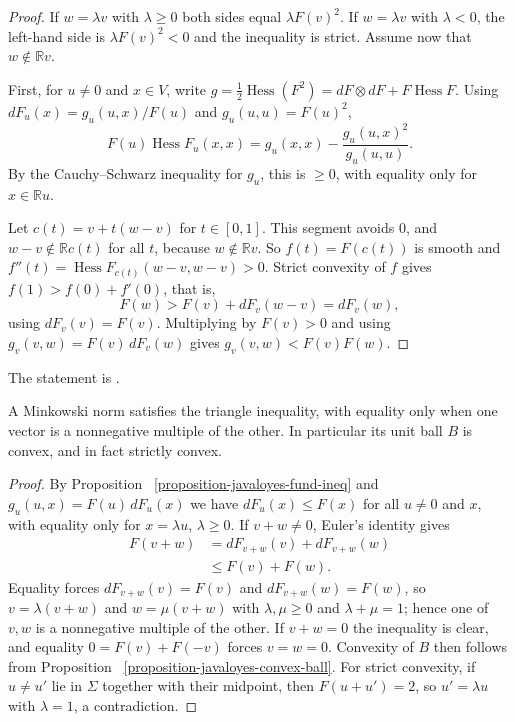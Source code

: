 \begin{proof}
If $w = \lambda v$ with $\lambda \geq 0$
both sides equal $\lambda F(v)^2$. If
$w = \lambda v$ with $\lambda < 0$, the
left-hand side is $\lambda F(v)^2 < 0$ and
the inequality is strict. Assume now that
$w \notin \mathbb{R}v$.

First, for $u \neq 0$ and $x \in V$, write
$g = \frac{1}{2}\operatorname{Hess}(F^2)
= dF \otimes dF + F \operatorname{Hess} F$.
Using $dF_u(x) = g_u(u,x)/F(u)$ and
$g_u(u,u) = F(u)^2$,
$$
F(u) \operatorname{Hess} F_u(x,x) =
g_u(x,x) - \frac{g_u(u,x)^2}{g_u(u,u)}.
$$
By the Cauchy--Schwarz inequality for
$g_u$, this is $\geq 0$, with equality only
for $x \in \mathbb{R}u$.

Let $c(t) = v + t(w - v)$ for
$t \in [0,1]$. This segment avoids $0$,
and $w - v \notin \mathbb{R}c(t)$ for all
$t$, because $w \notin \mathbb{R}v$. So
$f(t) = F(c(t))$ is smooth and
$f''(t) = \operatorname{Hess}
F_{c(t)}(w - v, w - v) > 0$. Strict
convexity of $f$ gives
$f(1) > f(0) + f'(0)$, that is,
$$
F(w) > F(v) + dF_v(w - v) = dF_v(w),
$$
using $dF_v(v) = F(v)$. Multiplying by
$F(v) > 0$ and using
$g_v(v,w) = F(v)\, dF_v(w)$ gives
$g_v(v,w) < F(v)F(w)$.
\end{proof}

\noindent
The statement is
\cite[Remark 2.9, (8)]%
{javaloyes2014definition}.

\begin{corollary}
\label{corollary-javaloyes-triangle}
A Minkowski norm satisfies the triangle
inequality, with equality only when one
vector is a nonnegative multiple of the
other. In particular its unit ball $B$ is
convex, and in fact strictly convex.
\end{corollary}

\begin{proof}
By Proposition~%
\ref{proposition-javaloyes-fund-ineq}
and $g_u(u,x) = F(u)\, dF_u(x)$ we have
$dF_u(x) \leq F(x)$ for all $u \neq 0$ and
$x$, with equality only for
$x = \lambda u$, $\lambda \geq 0$. If
$v + w \neq 0$, Euler's identity gives
$$
\begin{aligned}
F(v + w)
&= dF_{v+w}(v) + dF_{v+w}(w) \\
&\leq F(v) + F(w).
\end{aligned}
$$
Equality forces $dF_{v+w}(v)=F(v)$ and
$dF_{v+w}(w)=F(w)$, so $v=\lambda(v+w)$ and
$w=\mu(v+w)$ with $\lambda,\mu\geq 0$ and
$\lambda+\mu=1$; hence one of $v,w$ is a
nonnegative multiple of the other. If
$v + w = 0$ the inequality is clear, and
equality $0=F(v)+F(-v)$ forces $v=w=0$.
Convexity of $B$ then follows from
Proposition~%
\ref{proposition-javaloyes-convex-ball}.
For strict convexity, if $u\neq u'$ lie in
$\Sigma$ together with their midpoint, then
$F(u+u')=2$, so $u'=\lambda u$ with
$\lambda=1$, a contradiction.
\end{proof}

